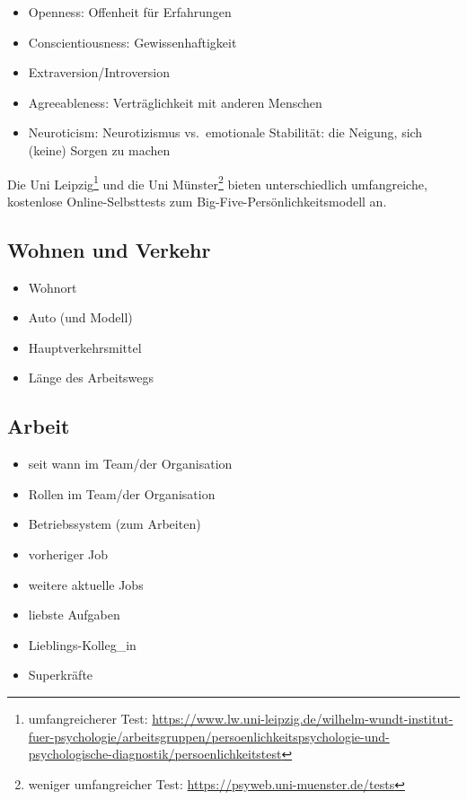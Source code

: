 \begin{itemize}
  \item {} Openness: Offenheit für Erfahrungen
  \item {} Conscientiousness: Gewissenhaftigkeit
  \item {} Extraversion/Introversion
  \item {} Agreeableness: Verträglichkeit mit anderen Menschen
  \item {} Neuroticism: Neurotizismus vs.~emotionale Stabilität: die Neigung, sich (keine) Sorgen zu machen
\end{itemize}

Die Uni Leipzig\footnote{umfangreicherer Test: \url{https://www.lw.uni-leipzig.de/wilhelm-wundt-institut-fuer-psychologie/arbeitsgruppen/persoenlichkeitspsychologie-und-psychologische-diagnostik/persoenlichkeitstest}} und die Uni Münster\footnote{weniger umfangreicher Test: \url{https://psyweb.uni-muenster.de/tests}} bieten unterschiedlich umfangreiche, kostenlose Online-Selbsttests zum Big-Five-Persönlichkeitsmodell an.


\subsection{Wohnen und Verkehr}

\begin{multicols}{2}
  \begin{itemize}
    \item Wohnort
    \item Auto (und Modell)
    \item Hauptverkehrsmittel
    \item Länge des Arbeitswegs
  \end{itemize}
\end{multicols}


\subsection{Arbeit}

\begin{multicols}{2}
  \begin{itemize}
    \item seit wann im Team/der Organisation
    \item Rollen im Team/der Organisation
    \item Betriebssystem (zum Arbeiten)
    \item vorheriger Job
    \item weitere aktuelle Jobs
    \item liebste Aufgaben
    \item Lieblings-Kolleg\_in
    \item Superkräfte
  \end{itemize}
\end{multicols}


